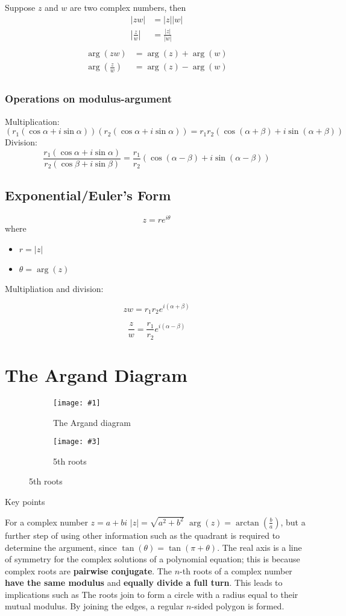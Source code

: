 \documentclass[11pt]{article}
\newcommand{\doubleimg}[4]{\begin{center}
  \begin{figure}[H]
    \centering
    \begin{subfigure}{.45\textwidth}
      \centering
      \texttt{[image: \#1]}
      \caption{#2}
      \label{fig:sub1}
    \end{subfigure}
    \begin{subfigure}{.45\textwidth}
      \centering
      \texttt{[image: \#3]}
      \caption{#4}
      \label{fig:sub2}
    \end{subfigure}
  \end{figure}
\end{center}}
\begin{document}
Suppose $z$ and $w$ are two complex numbers, then
\begin{align*}
  |zw|          & = |z||w|          \\
  |\frac{z}{w}| & = \frac{|z|}{|w|} \\
\end{align*}
\begin{align*}
  \arg(zw)          & = \arg(z) + \arg(w) \\
  \arg(\frac{z}{w}) & = \arg(z) - \arg(w) \\
\end{align*}

\subsubsection*{Operations on modulus-argument}
Multiplication:
$$\left(r_1(\cos \alpha + i\sin\alpha)\right)\left(r_2(\cos \alpha + i\sin\alpha)\right) = r_1r_2\left(\cos(\alpha + \beta) + i\sin(\alpha + \beta)\right)$$
Division:
$$\frac{r_1\left(\cos\alpha + i\sin\alpha\right)}{r_2\left(\cos \beta + i\sin\beta\right)} = \frac{r_1}{r_2}\left(\cos(\alpha - \beta) + i\sin(\alpha - \beta)\right)$$

\pagebreak

\subsection{Exponential/Euler's Form}

$$z = re^{i\theta}$$
where
\begin{itemize}
  \item $r = |z|$
  \item $\theta = \arg(z)$
\end{itemize}

\noindent Multipliation and division:

$$zw = r_1r_2e^{i(\alpha + \beta)}$$

$$\frac{z}{w} = \frac{r_1}{r_2}e^{i(\alpha - \beta)}$$

\pagebreak

\section{The Argand Diagram}

\doubleimg{figs/1.png}{The Argand diagram}{figs/roots.jpeg}{5th roots}

\noindent Key points
\begin{outline}[enumerate]
  \1 For a complex number $z = a + bi$
  \2 $|z| = \sqrt{a^2 + b^2}$
  \2 $\arg(z) = \arctan(\frac{b}{a})$, but a further step of using other information such as the quadrant is required to determine the argument, since $\tan(\theta) = \tan(\pi + \theta)$.
  \1 The real axis is a line of symmetry for the complex solutions of a polynomial equation; this is because complex roots are \textbf{pairwise conjugate}.
  \1 The $n$-th roots of a complex number \textbf{have the same modulus} and \textbf{equally divide a full turn}. This leads to implications such as
  \2 The roots join to form a circle with a radius equal to their mutual modulus.
  \2 By joining the edges, a regular $n$-sided polygon is formed.
\end{outline}
\end{document}
